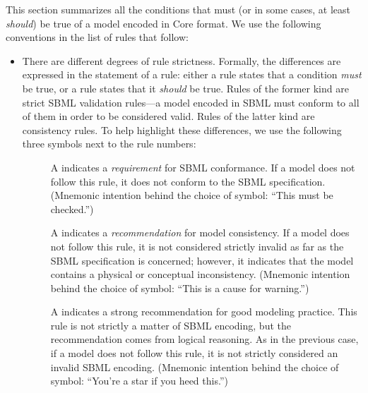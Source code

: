 This section summarizes all the conditions that must (or in some
cases, at least \emph{should}) be true of a model encoded in
\sbmlthree Core format.  We use the following conventions in the
list of rules that follow:
\begin{itemize}

\item There are different degrees of rule strictness.  Formally,
  the differences are expressed in the statement of a rule: either
  a rule states that a condition \emph{must} be true, or a rule
  states that it \emph{should} be true.  Rules of the former kind
  are strict SBML validation rules---a model encoded in SBML must
  conform to all of them in order to be considered valid.  Rules
  of the latter kind are consistency rules.  To help highlight
  these differences, we use the following three symbols next to
  the rule numbers:
  \begin{description}

  \item[\hspace*{7.8pt}\vSymbol] A \vSymbolName indicates a
    \emph{requirement} for SBML conformance. If a model does not
    follow this rule, it does not conform to the SBML
    specification.  (Mnemonic intention behind the choice of
    symbol: ``This must be checked.'')

  \item[\hspace*{8.7pt}\cSymbol] A \cSymbolName indicates a
    \emph{recommendation} for model consistency.  If a model does
    not follow this rule, it is not considered strictly invalid as
    far as the SBML specification is concerned; however, it
    indicates that the model contains a physical or conceptual
    inconsistency.  (Mnemonic intention behind the choice of
    symbol: ``This is a cause for warning.'')

  \item[\hspace*{7.5pt}\mSymbol] A \mSymbolName indicates a strong
    recommendation for good modeling practice.  This rule is not
    strictly a matter of SBML encoding, but the recommendation
    comes from logical reasoning.  As in the previous case, if a
    model does not follow this rule, it is not strictly considered
    an invalid SBML encoding.  (Mnemonic intention behind the
    choice of symbol: ``You're a star if you heed this.'')

  \end{description}


\end{itemize}

